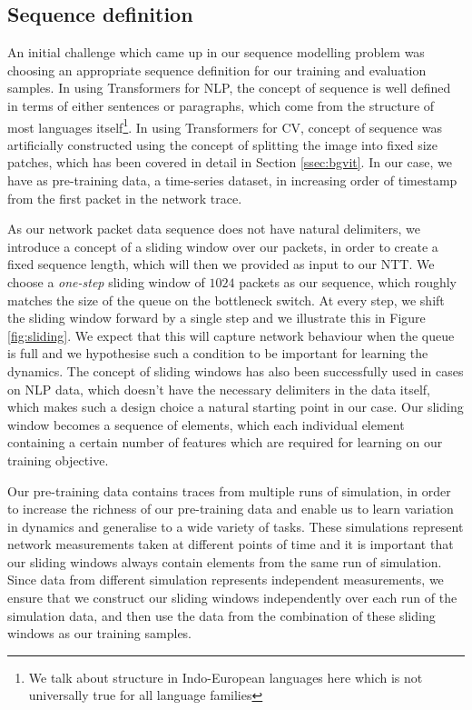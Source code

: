 \subsection{Sequence definition}
\label{ssec:desseq}
An initial challenge which came up in our sequence modelling problem was choosing an appropriate sequence definition for our training and evaluation samples. In using Transformers for NLP, the concept of sequence is well defined in terms of either sentences or paragraphs, which come from the structure of most languages itself\footnote{We talk about structure in Indo-European languages here which is not universally true for all language families}. In using Transformers for CV, concept of sequence was artificially constructed using the concept of splitting the image into fixed size patches, which has been covered in detail in Section \ref{ssec:bgvit}. In our case, we have as pre-training data, a time-series dataset, in increasing order of timestamp from the first packet in the network trace.

As our network packet data sequence does not have natural delimiters, we introduce a concept of a sliding window over our packets, in order to create a fixed sequence length, which will then we provided as input to our NTT. We choose a \emph{one-step} sliding window of $1024$ packets as our sequence, which roughly matches the size of the queue on the bottleneck switch. At every step, we shift the sliding window forward by a single step and we illustrate this in Figure \ref{fig:sliding}. We expect that this will capture network behaviour when the queue is full and we hypothesise such a condition to be important for learning the dynamics. The concept of sliding windows has also been successfully used in cases on NLP data, which doesn't have the necessary delimiters in the data itself\cite{beltagyLongformerLongDocumentTransformer2020}, which makes such a design choice a natural starting point in our case. Our sliding window becomes a sequence of elements, which each individual element containing a certain number of features which are required for learning on our training objective.

Our pre-training data contains traces from multiple runs of simulation, in order to increase the richness of our pre-training data and enable us to learn variation in dynamics and generalise to a wide variety of tasks. These simulations represent network measurements taken at different points of time and it is important that our sliding windows always contain elements from the same run of simulation. Since data from different simulation represents independent measurements, we ensure that we construct our sliding windows independently over each run of the simulation data, and then use the data from the combination of these sliding windows as our training samples.

